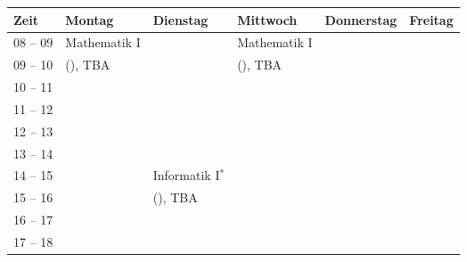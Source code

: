 \begin{minipage}{\textwidth}
    \footnotesize
\begin{center}
	\begin{tabular}{|l|l|l|l|l|l|}
	\hline
	 Zeit     &    Montag                    & Dienstag          & Mittwoch          & Donnerstag & Freitag \\ \hline\hline
	 08 -- 09 &    Mathematik I              &                   & Mathematik I      &  &  \\ \cline{1-1} \cline{3-3} \cline{5-6} 
	 09 -- 10 &    (\Matheprof), TBA         &                   & (\Matheprof), TBA &  &  \\ \hline
	 10 -- 11 &                              &                   &                   &  &  \\ \cline{1-1} \cline{3-6} 
	 11 -- 12 &                              &                   &                   &  &  \\ \hline
	 12 -- 13 &                              &                   &                   &  &  \\ \hline
	 13 -- 14 &                              &                   &                   &  &  \\ \hline
	 14 -- 15 &                              & Informatik I$^*$  &                   &  &  \\ \cline{1-2} \cline{4-6} 
	 15 -- 16 &                              & (\Infoprof), TBA  &                   &  &  \\ \hline
	 16 -- 17 &                              &                   &                   &  &  \\ \hline
	 17 -- 18 &                              &                   &                   &  &  \\ \hline 
	\end{tabular}


\end{center}
\end{minipage}

